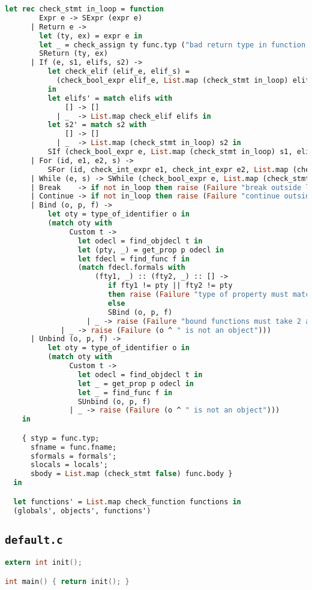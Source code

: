 \begin{lstlisting}[language=Caml,backgroundcolor=\color{backgroundcolor}]
    let rec check_stmt in_loop = function
        Expr e -> SExpr (expr e)
      | Return e ->
        let (ty, ex) = expr e in
        let _ = check_assign ty func.typ ("bad return type in function " ^ func.fname) in
        SReturn (ty, ex)
      | If (e, s1, elifs, s2) ->
          let check_elif (elif_e, elif_s) =
            (check_bool_expr elif_e, List.map (check_stmt in_loop) elif_s)
          in
          let elifs' = match elifs with
              [] -> []
            | _  -> List.map check_elif elifs in
          let s2' = match s2 with
              [] -> []
            | _  -> List.map (check_stmt in_loop) s2 in
          SIf (check_bool_expr e, List.map (check_stmt in_loop) s1, elifs', s2')
      | For (id, e1, e2, s) -> 
          SFor (id, check_int_expr e1, check_int_expr e2, List.map (check_stmt true) s)
      | While (e, s) -> SWhile (check_bool_expr e, List.map (check_stmt true) s)
      | Break    -> if not in_loop then raise (Failure "break outside loop") else SBreak
      | Continue -> if not in_loop then raise (Failure "continue outside loop") else SContinue
      | Bind (o, p, f) -> 
          let oty = type_of_identifier o in
          (match oty with
               Custom t ->
                 let odecl = find_objdecl t in
                 let (pty, _) = get_prop p odecl in
                 let fdecl = find_func f in
                 (match fdecl.formals with
                     (fty1, _) :: (fty2, _) :: [] ->
                        if fty1 != pty || fty2 != pty
                        then raise (Failure "type of property must match type of bound function arguments")
                        else
                        SBind (o, p, f)
                   | _ -> raise (Failure "bound functions must take 2 arguments"))
             | _ -> raise (Failure (o ^ " is not an object")))
      | Unbind (o, p, f) -> 
          let oty = type_of_identifier o in
          (match oty with
               Custom t ->
                 let odecl = find_objdecl t in
                 let _ = get_prop p odecl in
                 let _ = find_func f in
                 SUnbind (o, p, f)
               | _ -> raise (Failure (o ^ " is not an object")))
    in

    { styp = func.typ;
      sfname = func.fname;
      sformals = formals';
      slocals = locals';
      sbody = List.map (check_stmt false) func.body }
  in

  let functions' = List.map check_function functions in
  (globals', objects', functions')
\end{lstlisting}

\subsection{\texttt{default.c}}

\begin{lstlisting}[language=C,backgroundcolor=\color{backgroundcolor}]
extern int init(); 

int main() { return init(); }
\end{lstlisting}

